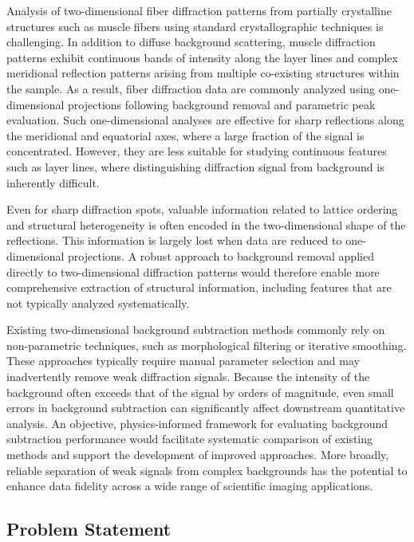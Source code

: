 \documentclass[iucr]{iucrjournals}
\begin{document}
Analysis of two-dimensional fiber diffraction patterns from partially crystalline structures such as muscle fibers using standard crystallographic techniques is challenging. In addition to diffuse background scattering, muscle diffraction patterns exhibit continuous bands of intensity along the layer lines and complex meridional reflection patterns arising from multiple co-existing structures within the sample. As a result, fiber diffraction data are commonly analyzed using one-dimensional projections following background removal and parametric peak evaluation. Such one-dimensional analyses are effective for sharp reflections along the meridional and equatorial axes, where a large fraction of the signal is concentrated. However, they are less suitable for studying continuous features such as layer lines, where distinguishing diffraction signal from background is inherently difficult.

Even for sharp diffraction spots, valuable information related to lattice ordering and structural heterogeneity is often encoded in the two-dimensional shape of the reflections. This information is largely lost when data are reduced to one-dimensional projections. A robust approach to background removal applied directly to two-dimensional diffraction patterns would therefore enable more comprehensive extraction of structural information, including features that are not typically analyzed systematically.

Existing two-dimensional background subtraction methods commonly rely on non-parametric techniques, such as morphological filtering or iterative smoothing. These approaches typically require manual parameter selection and may inadvertently remove weak diffraction signals. Because the intensity of the background often exceeds that of the signal by orders of magnitude, even small errors in background subtraction can significantly affect downstream quantitative analysis. An objective, physics-informed framework for evaluating background subtraction performance would facilitate systematic comparison of existing methods and support the development of improved approaches. More broadly, reliable separation of weak signals from complex backgrounds has the potential to enhance data fidelity across a wide range of scientific imaging applications.

\subsection{Problem Statement}
\end{document}
